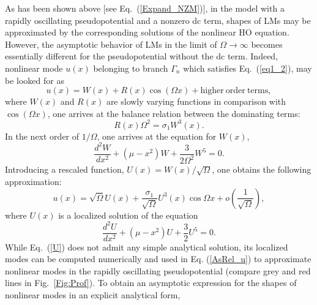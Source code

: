 \documentclass[aps,preprint,showkeys,
]{revtex4}
\begin{document}
As has been shown above [see Eq.~(\ref{Expand_NZM})], in the model with a
rapidly oscillating pseudopotential and a nonzero dc term, shapes of LMs may
be approximated by the corresponding solutions of the nonlinear HO equation.
However, the asymptotic behavior of LMs in the limit of $\Omega \rightarrow
\infty $ becomes essentially different for the pseudopotential without the
dc term. Indeed, nonlinear mode $u(x)$ belonging to branch $\Gamma _{n}$
which satisfies Eq.~(\ref{eq1_2}), may be looked for as
\begin{equation}
u(x)=W(x)+R(x)\cos \left( \Omega x\right) +\mathrm{higher}~\mathrm{order}~%
\mathrm{terms},  \label{Asym_hyp}
\end{equation}%
where $W(x)$ and $R(x)$ are slowly varying functions in comparison with $%
\cos \left( \Omega x\right) $, one arrives at the balance relation between
the dominating terms:
\begin{equation}
R(x)\Omega ^{2}=\sigma _{1}W^{3}(x).
\end{equation}%
In the next order of $1/\Omega $, one arrives at the equation for $W(x)$,
\begin{equation}
\frac{d^{2}W}{dx^{2}}+(\mu -x^{2})W+\frac{3}{2\Omega ^{2}}W^{5}=0.
\end{equation}%
Introducing a rescaled function, $U(x)=W(x)/\sqrt{\Omega }$, one obtains the
following approximation:
\begin{equation}
u(x)=\sqrt{\Omega }U(x)+\frac{\sigma _{1}}{\sqrt{\Omega }}U^{3}(x)\cos
\Omega x+o\left( \frac{1}{\sqrt{\Omega }}\right) ,  \label{AsRel_u}
\end{equation}%
where $U(x)$ is a localized solution of the equation
\begin{equation}
\frac{d^{2}U}{dx^{2}}+(\mu -x^{2})U+\frac{3}{2}U^{5}=0.  \label{U}
\end{equation}%
While Eq.~(\ref{U}) does not admit any simple analytical solution, its
localized modes can be computed numerically and used in Eq. (\ref{AsRel_u})
to approximate nonlinear modes in the rapidly oscillating pseudopotential
(compare grey and red lines in Fig.~\ref{Fig:Prof}). To obtain an asymptotic
expression for the shapes of nonlinear modes in an explicit analytical form,
\end{document}
